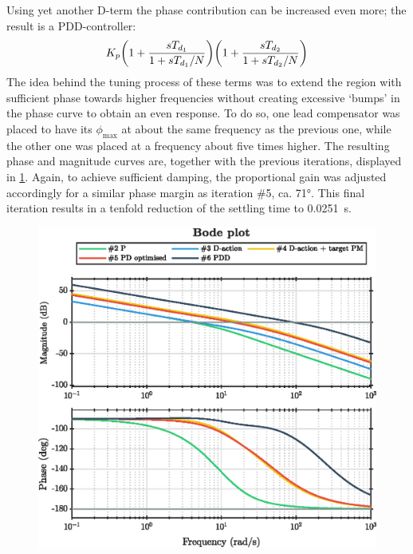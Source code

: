 Using yet another D-term the phase contribution can be increased even more; the result is a PDD-controller:
\begin{equation}
K_p \qty(1 + \frac{sT_{d_1}}{1 + sT_{d_1}/N})\qty(1 + \frac{sT_{d_2}}{1 + sT_{d_2}/N})
\label{eq:pdd}
\end{equation}
The idea behind the tuning process of these terms was to extend the region with sufficient phase towards higher frequencies without creating excessive `bumps' in the phase curve to obtain an even response. To do so, one lead compensator was placed to have its $\phi_\text{max}$ at about the same frequency as the previous one, while the other one was placed at a frequency about five times higher. The resulting phase and magnitude curves are, together with the previous iterations, displayed in \cref{fig:cont_controllers_bode}. Again, to achieve sufficient damping, the proportional gain was adjusted accordingly for a similar phase margin as iteration \#5, ca. \ang{71}. This final iteration results in a tenfold reduction of the settling time to \SI{0.0251}{\second}.
\begin{figure}[ht]
    \centering
    \includegraphics[]{media/q1/pd_controllers_bode.eps}
    \caption{}
    \label{fig:cont_controllers_bode}
\end{figure}
